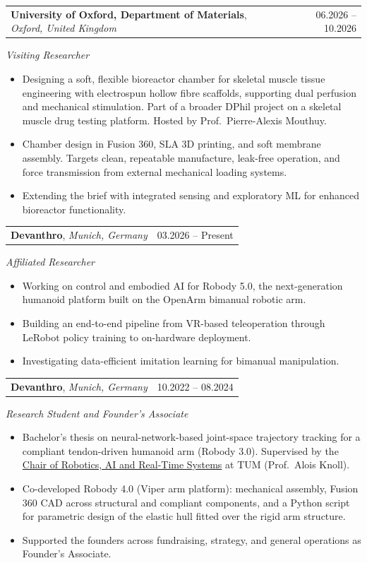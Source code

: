 \documentclass[11pt,a4paper]{article}
\makeatletter
\newcommand{\cventry}[3]{%
    \begin{tabularx}{\textwidth}{@{}Xr@{}}
        \textbf{#1}, \textit{#2} & #3 \\
    \end{tabularx}%
    \vspace{-0.35em}\par%
}
\makeatother
\begin{document}
\cventry{University of Oxford, Department of Materials}{Oxford, United Kingdom}{06.2026 -- 10.2026}
\textit{Visiting Researcher}
\begin{itemize}
    \item Designing a soft, flexible bioreactor chamber for skeletal muscle tissue engineering with electrospun hollow fibre scaffolds, supporting dual perfusion and mechanical stimulation. Part of a broader DPhil project on a skeletal muscle drug testing platform. Hosted by Prof.\ Pierre-Alexis Mouthuy.
    \item Chamber design in Fusion 360, SLA 3D printing, and soft membrane assembly. Targets clean, repeatable manufacture, leak-free operation, and force transmission from external mechanical loading systems.
    \item Extending the brief with integrated sensing and exploratory ML for enhanced bioreactor functionality.
\end{itemize}

\vspace{0.25em}
\cventry{Devanthro}{Munich, Germany}{03.2026 -- Present}
\textit{Affiliated Researcher}
\begin{itemize}
    \item Working on control and embodied AI for Robody 5.0, the next-generation humanoid platform built on the OpenArm bimanual robotic arm.
    \item Building an end-to-end pipeline from VR-based teleoperation through LeRobot policy training to on-hardware deployment.
    \item Investigating data-efficient imitation learning for bimanual manipulation.
\end{itemize}

\vspace{0.25em}
\cventry{Devanthro}{Munich, Germany}{10.2022 -- 08.2024}
\textit{Research Student and Founder's Associate}
\begin{itemize}
    \item Bachelor's thesis on neural-network-based joint-space trajectory tracking for a compliant tendon-driven humanoid arm (Robody 3.0). Supervised by the \href{https://www.ce.cit.tum.de/en/air/home/}{Chair of Robotics, AI and Real-Time Systems} at TUM (Prof.\ Alois Knoll).
    \item Co-developed Robody 4.0 (Viper arm platform): mechanical assembly, Fusion 360 CAD across structural and compliant components, and a Python script for parametric design of the elastic hull fitted over the rigid arm structure.
    \item Supported the founders across fundraising, strategy, and general operations as Founder's Associate.
\end{itemize}
\end{document}

